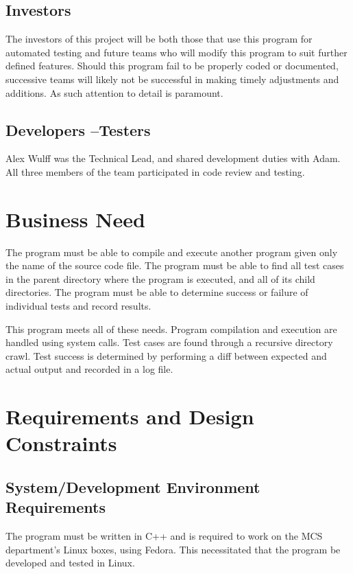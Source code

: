 \subsection {Investors}
The investors of this project will be both those that use this program for automated testing and future teams who will modify this program to suit further defined features.  Should this program fail to be properly coded or documented, successive teams will likely not be successful in making timely adjustments and additions.  As such attention to detail is paramount.

\subsection{Developers --Testers}
Alex Wulff was the Technical Lead, and shared development duties with Adam. All three members of the team participated in code review and testing.

\section{Business Need}
The program must be able to compile and execute another program given only the name of the source code file.\newline\newline
The program must be able to find all test cases in the parent directory where the program is executed, and all of its child directories.\newline\newline
The program must be able to determine success or failure of individual tests and record results.\newline\newline

This program meets all of these needs. Program compilation and execution are handled using system calls. Test cases are found through a recursive directory crawl. Test success is determined by performing a diff between expected and actual output and recorded in a log file.

\section{Requirements and Design Constraints}

\subsection{System/Development Environment Requirements}
The program must be written in C++ and is required to work on the MCS department's Linux boxes, using Fedora. This necessitated that the program be developed and tested in Linux.


